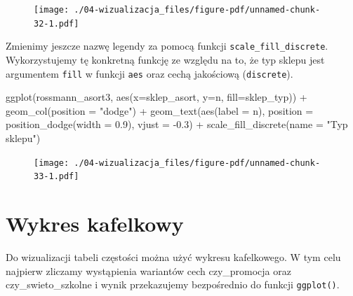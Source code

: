 \documentclass[
  letterpaper,
  DIV=11,
  numbers=noendperiod]{scrreprt}
\newenvironment{Shaded}{\begin{snugshade}}{\end{snugshade}}
\newcommand{\AttributeTok}[1]{\textcolor[rgb]{0.40,0.45,0.13}{#1}}
\newcommand{\FloatTok}[1]{\textcolor[rgb]{0.68,0.00,0.00}{#1}}
\newcommand{\FunctionTok}[1]{\textcolor[rgb]{0.28,0.35,0.67}{#1}}
\newcommand{\NormalTok}[1]{\textcolor[rgb]{0.00,0.23,0.31}{#1}}
\newcommand{\SpecialCharTok}[1]{\textcolor[rgb]{0.37,0.37,0.37}{#1}}
\newcommand{\StringTok}[1]{\textcolor[rgb]{0.13,0.47,0.30}{#1}}
\begin{document}
\begin{figure}[H]

{\centering \texttt{[image: ./04-wizualizacja\_files/figure-pdf/unnamed-chunk-32-1.pdf]}

}

\end{figure}

Zmienimy jeszcze nazwę legendy za pomocą funkcji
\texttt{scale\_fill\_discrete}. Wykorzystujemy tę konkretną funkcję ze
względu na to, że typ sklepu jest argumentem \texttt{fill} w funkcji
\texttt{aes} oraz cechą jakościową (\texttt{discrete}).

\begin{Shaded}
\begin{Highlighting}[]
\FunctionTok{ggplot}\NormalTok{(rossmann\_asort3, }\FunctionTok{aes}\NormalTok{(}\AttributeTok{x=}\NormalTok{sklep\_asort, }\AttributeTok{y=}\NormalTok{n, }\AttributeTok{fill=}\NormalTok{sklep\_typ)) }\SpecialCharTok{+}
  \FunctionTok{geom\_col}\NormalTok{(}\AttributeTok{position =} \StringTok{"dodge"}\NormalTok{) }\SpecialCharTok{+} 
  \FunctionTok{geom\_text}\NormalTok{(}\FunctionTok{aes}\NormalTok{(}\AttributeTok{label =}\NormalTok{ n), }
            \AttributeTok{position =} \FunctionTok{position\_dodge}\NormalTok{(}\AttributeTok{width =} \FloatTok{0.9}\NormalTok{),}
            \AttributeTok{vjust =} \SpecialCharTok{{-}}\FloatTok{0.3}\NormalTok{) }\SpecialCharTok{+}
  \FunctionTok{scale\_fill\_discrete}\NormalTok{(}\AttributeTok{name =} \StringTok{"Typ sklepu"}\NormalTok{)}
\end{Highlighting}
\end{Shaded}

\begin{figure}[H]

{\centering \texttt{[image: ./04-wizualizacja\_files/figure-pdf/unnamed-chunk-33-1.pdf]}

}

\end{figure}

\hypertarget{wykres-kafelkowy}{%
\section{Wykres kafelkowy}\label{wykres-kafelkowy}}

Do wizualizacji tabeli częstości można użyć wykresu kafelkowego. W tym
celu najpierw zliczamy wystąpienia wariantów cech czy\_promocja oraz
czy\_swieto\_szkolne i wynik przekazujemy bezpośrednio do funkcji
\texttt{ggplot()}.
\end{document}
